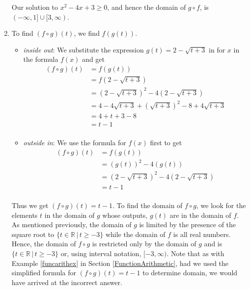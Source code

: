 \begin{ex}
\begin{enumerate}
\begin{center}
\end{center}

Our solution to $x^2-4x+3 \geq 0$, and hence the domain of $g \circ f$, is $(-\infty, 1] \cup [3,\infty)$.

\item  To find $(f \circ g)(t)$, we find $f(g(t))$. 

\begin{itemize}

\item  \textit{inside out}: We substitute the expression $g(t) = 2 - \sqrt{t+3}$ in for $x$ in the formula $f(x)$ and get 
\begin{align*}
(f \circ g)(t) &= f(g(t)) \\
	&= f\left(2-\sqrt{t+3}\right) \\
 	& = \left(2-\sqrt{t+3}\right)^2 - 4\left(2-\sqrt{t+3}\right) \\
 	& = 4 - 4\sqrt{t+3} + \left(\sqrt{t+3}\right)^2 - 8 + 4 \sqrt{t+3} \\
 	& = 4 + t+3 - 8 \\ 
 	& = t-1 \\
 \end{align*}

\item  \textit{outside in}:  We use the formula for $f(x)$ first to get
\begin{align*}
	(f \circ g)(t) &= f(g(t)) \\
	& = \left(g(t)\right)^2 - 4\left(g(t)\right) \\
 	& = \left(2-\sqrt{t+3}\right)^2 - 4\left(2-\sqrt{t+3}\right) \\
	& = t-1 \tag{same algebra as before} \\
 \end{align*}

\end{itemize}

Thus we get $(f \circ g)(t) = t-1$.  To find the domain of $f \circ g$, we look for the elements $t$ in the domain of $g$ whose outputs, $g(t)$ are in the domain of $f$.   As mentioned previously, the domain of $g$ is limited by the presence of the square root to  $\{ t \in \mathbb{R} \, | \, t \geq -3\}$  while the domain of $f$ is all real numbers.  Hence,  the domain of $f \circ g$ is restricted only by the domain of $g$ and is $\{ t \in \mathbb{R} \, | \, t \geq -3\}$ or, using interval notation,  $[-3, \infty)$.  Note that as with Example \ref{funcarithex}  in Section \ref{FunctionArithmetic}, had we used the simplified formula for $(f \circ g)(t) = t-1$  to determine domain, we would have arrived at the incorrect answer.




\end{enumerate}
\end{ex}
